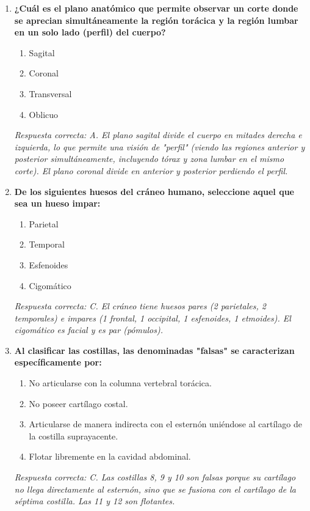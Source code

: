 \begin{enumerate}[label=\textbf{\arabic*.}]
    \item \textbf{¿Cuál es el plano anatómico que permite observar un corte donde se aprecian simultáneamente la región torácica y la región lumbar en un solo lado (perfil) del cuerpo?}
    \begin{enumerate}
        \item[A)] Sagital
        \item[B)] Coronal
        \item[C)] Transversal
        \item[D)] Oblicuo
    \end{enumerate}
    \textit{Respuesta correcta: A. El plano sagital divide el cuerpo en mitades derecha e izquierda, lo que permite una visión de "perfil" (viendo las regiones anterior y posterior simultáneamente, incluyendo tórax y zona lumbar en el mismo corte). El plano coronal divide en anterior y posterior perdiendo el perfil.}

    \item \textbf{De los siguientes huesos del cráneo humano, seleccione aquel que sea un hueso impar:}
    \begin{enumerate}
        \item[A)] Parietal
        \item[B)] Temporal
        \item[C)] Esfenoides
        \item[D)] Cigomático
    \end{enumerate}
    \textit{Respuesta correcta: C. El cráneo tiene huesos pares (2 parietales, 2 temporales) e impares (1 frontal, 1 occipital, 1 esfenoides, 1 etmoides). El cigomático es facial y es par (pómulos).}

    \item \textbf{Al clasificar las costillas, las denominadas "falsas" se caracterizan específicamente por:}
    \begin{enumerate}
        \item[A)] No articularse con la columna vertebral torácica.
        \item[B)] No poseer cartílago costal.
        \item[C)] Articularse de manera indirecta con el esternón uniéndose al cartílago de la costilla suprayacente.
        \item[D)] Flotar libremente en la cavidad abdominal.
    \end{enumerate}
    \textit{Respuesta correcta: C. Las costillas 8, 9 y 10 son falsas porque su cartílago no llega directamente al esternón, sino que se fusiona con el cartílago de la séptima costilla. Las 11 y 12 son flotantes.}


\end{enumerate}
